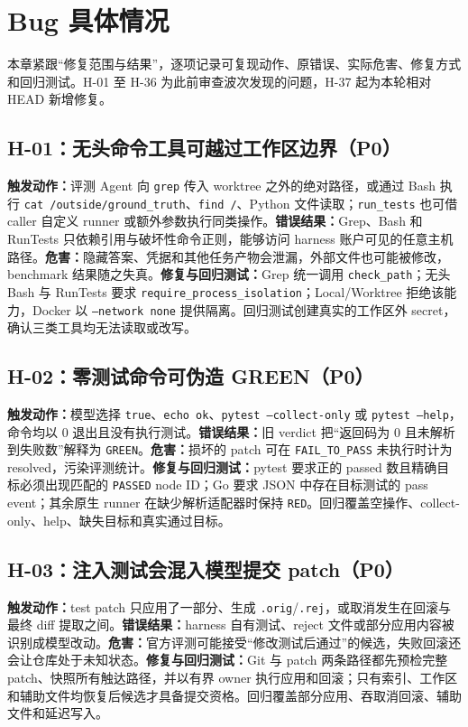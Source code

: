 \documentclass[11pt,a4paper,fontset=fandol]{ctexart}
\newcommand{\code}[1]{\texttt{#1}}
\begin{document}
\section{Bug 具体情况}

本章紧跟“修复范围与结果”，逐项记录可复现动作、原错误、实际危害、修复方式和回归测试。H-01 至 H-36 为此前审查波次发现的问题，H-37 起为本轮相对 HEAD 新增修复。

\subsection{H-01：无头命令工具可越过工作区边界（P0）}

\textbf{触发动作：}评测 Agent 向 \code{grep} 传入 worktree 之外的绝对路径，或通过 Bash 执行 \code{cat /outside/ground\_truth}、\code{find /}、Python 文件读取；\code{run\_tests} 也可借 caller 自定义 runner 或额外参数执行同类操作。\textbf{错误结果：}Grep、Bash 和 RunTests 只依赖引用与破坏性命令正则，能够访问 harness 账户可见的任意主机路径。\textbf{危害：}隐藏答案、凭据和其他任务产物会泄漏，外部文件也可能被修改，benchmark 结果随之失真。\textbf{修复与回归测试：}Grep 统一调用 \code{check\_path}；无头 Bash 与 RunTests 要求 \code{require\_process\_isolation}；Local/Worktree 拒绝该能力，Docker 以 \code{--network none} 提供隔离。回归测试创建真实的工作区外 secret，确认三类工具均无法读取或改写。

\subsection{H-02：零测试命令可伪造 GREEN（P0）}

\textbf{触发动作：}模型选择 \code{true}、\code{echo ok}、\code{pytest --collect-only} 或 \code{pytest --help}，命令均以 0 退出且没有执行测试。\textbf{错误结果：}旧 verdict 把“返回码为 0 且未解析到失败数”解释为 \code{GREEN}。\textbf{危害：}损坏的 patch 可在 \code{FAIL\_TO\_PASS} 未执行时计为 resolved，污染评测统计。\textbf{修复与回归测试：}pytest 要求正的 passed 数且精确目标必须出现匹配的 \code{PASSED} node ID；Go 要求 JSON 中存在目标测试的 pass event；其余原生 runner 在缺少解析适配器时保持 \code{RED}。回归覆盖空操作、collect-only、help、缺失目标和真实通过目标。

\subsection{H-03：注入测试会混入模型提交 patch（P0）}

\textbf{触发动作：}test patch 只应用了一部分、生成 \code{.orig}/\code{.rej}，或取消发生在回滚与最终 diff 提取之间。\textbf{错误结果：}harness 自有测试、reject 文件或部分应用内容被识别成模型改动。\textbf{危害：}官方评测可能接受“修改测试后通过”的候选，失败回滚还会让仓库处于未知状态。\textbf{修复与回归测试：}Git 与 patch 两条路径都先预检完整 patch、快照所有触达路径，并以有界 owner 执行应用和回滚；只有索引、工作区和辅助文件均恢复后候选才具备提交资格。回归覆盖部分应用、吞取消回滚、辅助文件和延迟写入。
\end{document}
